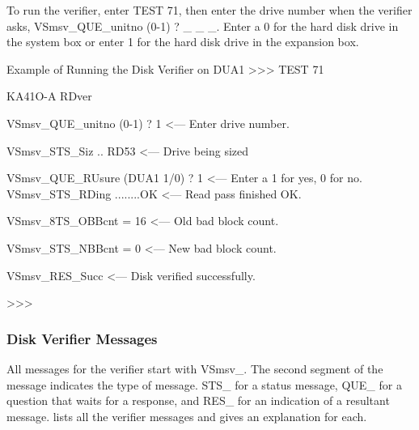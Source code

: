 To run the verifier, enter TEST 71, then enter the drive number when the
verifier asks, VSmsv\_QUE\_unitno (0-1) ? \_ \_ \_. Enter a 0 for the hard disk
drive in the system box or enter 1 for the hard disk drive in the expansion
box.

\begin{ttfig}{Example of Running the Disk Verifier on DUA1}
>>> TEST 71

                       KA41O-A RDver

VSmsv_QUE_unitno (0-1) ?  1       <--- Enter drive number.

VSmsv_STS_Siz .. RD53             <--- Drive being sized

VSmsv_QUE_RUsure (DUA1 1/0) ? 1   <--- Enter a 1 for yes,
                                       0 for no.
VSmsv_STS_RDing ........OK        <--- Read pass finished OK.

VSmsv_8TS_OBBcnt = 16             <--- Old bad block count.

VSmsv_STS_NBBcnt = 0              <--- New bad block count.

VSmsv_RES_Succ                    <--- Disk verified
                                       successfully.

>>>
\end{ttfig}

\subsubsection{Disk Verifier Messages}

All messages for the verifier start with VSmsv\_. The second segment of
the message indicates the type of message. STS\_ for a status message,
QUE\_ for a question that waits for a response, and RES\_ for an indication
of a resultant message.  lists all the verifier messages and gives
an explanation for each.

